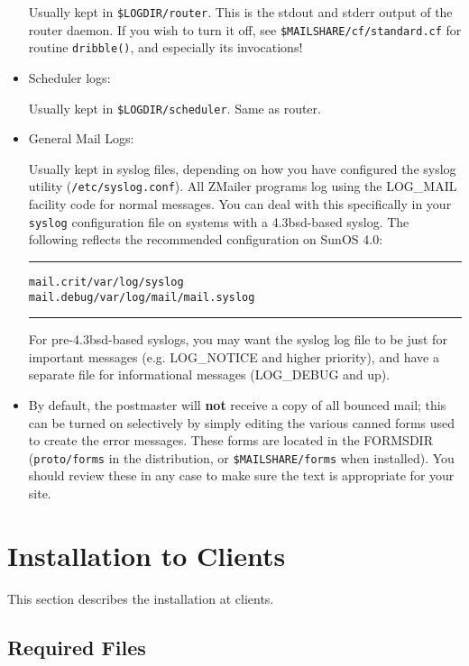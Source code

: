 \begin{multicols}{2}
\begin{itemize}
Usually kept in {\tt \$LOGDIR/router}.  This is the stdout
and stderr output of the router daemon.  If you wish to turn it off,
see {\tt\$MAILSHARE/cf/standard.cf} for routine  {\tt dribble()},
and especially its invocations!

\item Scheduler logs:

Usually kept in {\tt \$LOGDIR/scheduler}.  Same as router.

\vspace{1pt}
\item General Mail Logs:

Usually kept in syslog files, depending on how you have configured
the syslog utility ({\tt /etc/syslog.conf}).
All ZMailer programs log using the LOG\_MAIL facility code for normal
messages.  You can deal with this specifically in your {\tt syslog}
configuration file on systems with a 4.3bsd-based syslog.  The
following reflects the recommended configuration on SunOS 4.0:
\begin{alltt}\medskip\small\hrule\medskip
mail.crit   /var/log/syslog
mail.debug  /var/log/mail/mail.syslog
\medskip\hrule\end{alltt}\medskip

For pre-4.3bsd-based syslogs, you may want the syslog log file
to be just for important messages (e.g. LOG\_NOTICE and higher
priority), and have a separate file for informational messages
(LOG\_DEBUG and up).

\item By default, the postmaster will {\bf not} receive a copy
of all bounced mail; this can be turned on selectively by simply
editing the various canned forms used to create the error messages.
These forms are located in the FORMSDIR ({\tt proto/forms} in
the distribution, or {\tt \$MAILSHARE/forms} when installed).
You should review these in any case to make sure the text is
appropriate for your site.

\end{itemize}


\section{Installation to Clients}

This section describes the installation at clients.


\subsection{Required Files}


\end{multicols}
